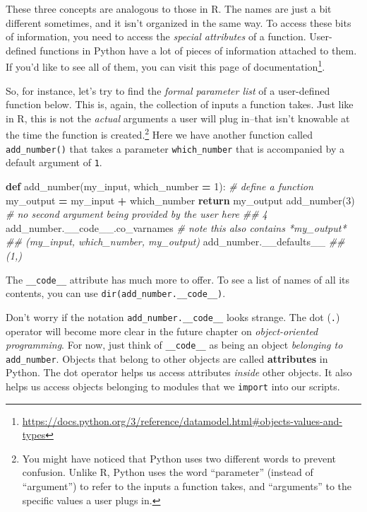 \documentclass[
  12pt,
  krantz2]{krantz}
\makeatletter
\newenvironment{Shaded}{\begin{snugshade}}{\end{snugshade}}
\newcommand{\CommentTok}[1]{\textcolor[rgb]{0.37,0.37,0.37}{\textit{#1}}}
\newcommand{\ControlFlowTok}[1]{\textcolor[rgb]{0.27,0.27,0.27}{\textbf{#1}}}
\newcommand{\DecValTok}[1]{\textcolor[rgb]{0.06,0.06,0.06}{#1}}
\newcommand{\KeywordTok}[1]{\textcolor[rgb]{0.27,0.27,0.27}{\textbf{#1}}}
\newcommand{\NormalTok}[1]{#1}
\newcommand{\OperatorTok}[1]{\textcolor[rgb]{0.43,0.43,0.43}{\textbf{#1}}}
\renewcommand{\href}[2]{#2\footnote{\url{#1}}}
\newenvironment{kframe}{%
\medskip{}
\setlength{\fboxsep}{.8em}
 \def\at@end@of@kframe{}%
 \ifinner\ifhmode%
  \def\at@end@of@kframe{\end{minipage}}%
  \begin{minipage}{\columnwidth}%
 \fi\fi%
 \def\FrameCommand##1{\hskip\@totalleftmargin \hskip-\fboxsep
 \colorbox{shadecolor}{##1}\hskip-\fboxsep
     \hskip-\linewidth \hskip-\@totalleftmargin \hskip\columnwidth}%
 \MakeFramed {\advance\hsize-\width
   \@totalleftmargin\z@ \linewidth\hsize
   \@setminipage}}%
 {\par\unskip\endMakeFramed%
 \at@end@of@kframe}
\renewenvironment{Shaded}{\begin{kframe}}{\end{kframe}}
\makeatother
\begin{document}
These three concepts are analogous to those in R. The names are just a bit different sometimes, and it isn't organized in the same way. To access these bits of information, you need to access the \emph{special attributes} of a function. User-defined functions in Python have a lot of pieces of information attached to them. If you'd like to see all of them, you can visit \href{https://docs.python.org/3/reference/datamodel.html\#objects-values-and-types}{this page of documentation}.

So, for instance, let's try to find the \emph{formal parameter list} of a user-defined function below. This is, again, the collection of inputs a function takes. Just like in R, this is not the \emph{actual} arguments a user will plug in--that isn't knowable at the time the function is created.\footnote{You might have noticed that Python uses two different words to prevent confusion. Unlike R, Python uses the word ``parameter'' (instead of ``argument'') to refer to the inputs a function takes, and ``arguments'' to the specific values a user plugs in.} Here we have another function called \texttt{add\_number()} that takes a parameter \texttt{which\_number} that is accompanied by a default argument of \texttt{1}.

\begin{Shaded}
\begin{Highlighting}[]
\KeywordTok{def}\NormalTok{ add\_number(my\_input, which\_number }\OperatorTok{=} \DecValTok{1}\NormalTok{): }\CommentTok{\# define a function}
\NormalTok{  my\_output }\OperatorTok{=}\NormalTok{ my\_input }\OperatorTok{+}\NormalTok{ which\_number}
  \ControlFlowTok{return}\NormalTok{ my\_output}
\NormalTok{add\_number(}\DecValTok{3}\NormalTok{) }\CommentTok{\# no second argument being provided by the user here}
\CommentTok{\#\# 4}
\NormalTok{add\_number.\_\_code\_\_.co\_varnames }\CommentTok{\# note this also contains *my\_output*}
\CommentTok{\#\# (\textquotesingle{}my\_input\textquotesingle{}, \textquotesingle{}which\_number\textquotesingle{}, \textquotesingle{}my\_output\textquotesingle{})}
\NormalTok{add\_number.\_\_defaults\_\_}
\CommentTok{\#\# (1,)}
\end{Highlighting}
\end{Shaded}

The \texttt{\_\_code\_\_} attribute has much more to offer. To see a list of names of all its contents, you can use \texttt{dir(add\_number.\_\_code\_\_)}.

Don't worry if the notation \texttt{add\_number.\_\_code\_\_} looks strange. The dot (\texttt{.}) operator will become more clear in the future chapter on \emph{object-oriented programming}. For now, just think of \texttt{\_\_code\_\_} as being an object \emph{belonging to} \texttt{add\_number}. Objects that belong to other objects are called \textbf{attributes} in Python. The dot operator helps us access attributes \emph{inside} other objects. It also helps us access objects belonging to modules that we \texttt{import} into our scripts.
\end{document}
